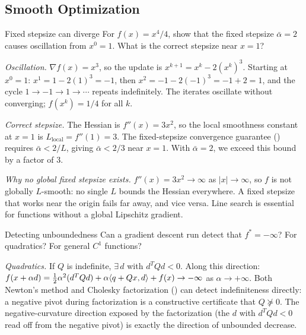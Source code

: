 \subsection{Smooth Optimization}\label{app:ex-smooth}

\begin{exercise}{Fixed stepsize can diverge}\label{ex:too-large-stepsize}
	For $f(x) = x^4/4$, show that the fixed stepsize $\bar{\alpha} = 2$ causes oscillation from $x^0 = 1$.
	What is the correct stepsize near $x = 1$?
\end{exercise}

\solution
\textit{Oscillation.}
$\nabla f(x) = x^3$, so the update is $x^{k+1} = x^k - 2(x^k)^3$.
Starting at $x^0 = 1$: $x^1 = 1 - 2(1)^3 = -1$, then $x^2 = -1 - 2(-1)^3 = -1 + 2 = 1$, and the cycle $1 \to -1 \to 1 \to \cdots$ repeats indefinitely.
The iterates oscillate without converging; $f(x^k) = 1/4$ for all $k$.

\textit{Correct stepsize.}
The Hessian is $f''(x) = 3x^2$, so the local smoothness constant at $x = 1$ is $L_{\text{local}} = f''(1) = 3$.
The fixed-stepsize convergence guarantee () requires $\bar{\alpha} < 2/L$, giving $\bar{\alpha} < 2/3$ near $x = 1$.
With $\bar{\alpha} = 2$, we exceed this bound by a factor of $3$.

\textit{Why no global fixed stepsize exists.}
$f''(x) = 3x^2 \to \infty$ as $|x| \to \infty$, so $f$ is not globally $L$-smooth: no single $L$ bounds the Hessian everywhere.
A fixed stepsize that works near the origin fails far away, and vice versa.
Line search is essential for functions without a global Lipschitz gradient.

\begin{exercise}{Detecting unboundedness}\label{ex:detect-unbounded}
	Can a gradient descent run detect that $f^* = -\infty$?
	For quadratics? For general $C^1$ functions?
\end{exercise}

\solution
\textit{Quadratics.}
If $Q$ is indefinite, $\exists\, d$ with $d^T Q d < 0$.
Along this direction:
$f(x + \alpha d) = \frac{1}{2}\alpha^2 (d^T Q d) + \alpha \langle q + Qx, d\rangle + f(x) \to -\infty$ as $\alpha \to +\infty$.
Both Newton's method and Cholesky factorization () can detect indefiniteness directly: a negative pivot during factorization is a constructive certificate that $Q \not\succeq 0$.
The negative-curvature direction exposed by the factorization (the $d$ with $d^T Q d < 0$ read off from the negative pivot) is exactly the direction of unbounded decrease.

